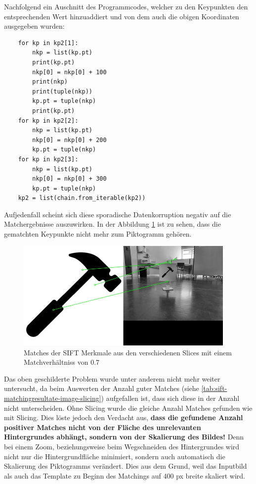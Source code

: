 Nachfolgend ein Auschnitt des Programmcodes, welcher zu den Keypunkten den entsprechenden Wert hinzuaddiert und von dem auch die obigen Koordinaten ausgegeben wurden:

\begin{verbatim}
    for kp in kp2[1]:
        nkp = list(kp.pt)
        print(kp.pt)
        nkp[0] = nkp[0] + 100
        print(nkp)
        print(tuple(nkp))
        kp.pt = tuple(nkp)
        print(kp.pt)
    for kp in kp2[2]:
        nkp = list(kp.pt)
        nkp[0] = nkp[0] + 200
        kp.pt = tuple(nkp)
    for kp in kp2[3]:
        nkp = list(kp.pt)
        nkp[0] = nkp[0] + 300
        kp.pt = tuple(nkp)
    kp2 = list(chain.from_iterable(kp2))
\end{verbatim}

Aufjedenfall scheint sich diese sporadische Datenkorruption negativ auf die Matchergebnisse auszuwirken. In der Abbildung \ref{fig:sift-matches-slice} ist zu sehen, dass die gematchten Keypunkte nicht mehr zum Piktogramm gehören. 

\begin{figure}[H]
  \includegraphics[width=0.95\textwidth]{img/piktogrammerkennung/sift_matches_slice.jpg}
  \centering
  \caption{Matches der SIFT Merkmale aus den verschiedenen Slices mit einem Matchverhältniss von 0.7}
  \label{fig:sift-matches-slice}
\end{figure}

Das oben geschilderte Problem wurde unter anderem nicht mehr weiter untersucht, da beim Auswerten der Anzahl guter Matches (siehe \ref{tab:sift-matchingresultate-image-slicing}) aufgefallen ist, dass sich diese in der Anzahl nicht unterscheiden. Ohne Slicing wurde die gleiche Anzahl Matches gefunden wie mit Slicing. Dies löste jedoch den Verdacht aus, \textbf{dass die gefundene Anzahl positiver Matches nicht von der Fläche des unrelevanten Hintergrundes abhängt, sondern von der Skalierung des Bildes!} Denn bei einem Zoom, beziehungsweise beim Wegschneiden des Hintergrundes wird nicht nur die Hintergrundfläche minimiert, sondern auch automatisch die Skalierung des Piktogramms verändert. Dies aus dem Grund, weil das Inputbild als auch das Template zu Beginn des Matchings auf 400 px breite skaliert wird.

